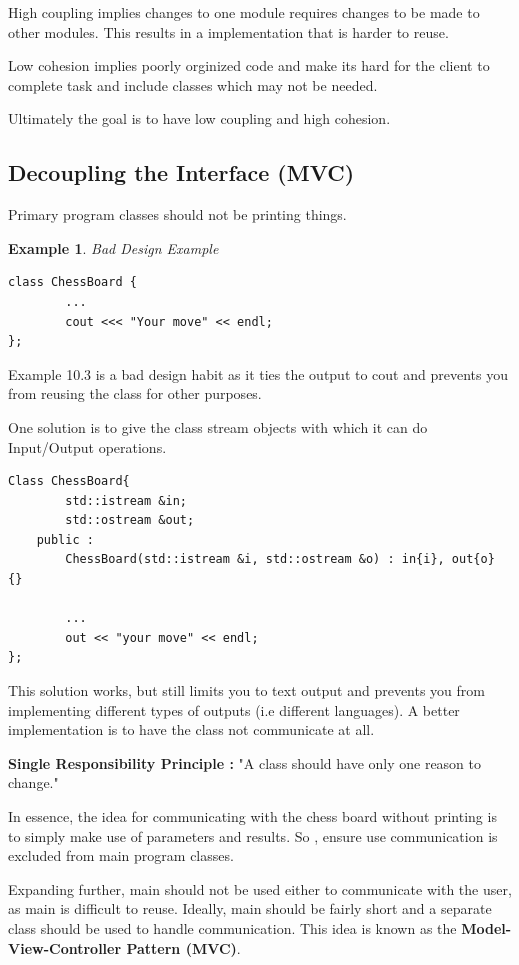 \documentclass{article}
\newtheorem{ex}[theorem]{Example}
\begin{document}
High coupling implies changes to one module requires changes to be made to other modules. This results in a implementation that is harder to reuse. 

Low cohesion implies poorly orginized code and make its hard for the client to complete task and include classes which may not be needed. 

Ultimately the goal is to have low coupling and high cohesion. 
 
\subsection{Decoupling the Interface (MVC)}
Primary program classes should not be printing things. 

\begin{ex}  Bad Design Example 
\begin{lstlisting}
class ChessBoard { 
		...
		cout <<< "Your move" << endl;
};
\end{lstlisting}
\end{ex}

Example 10.3 is a bad design habit as it ties the output to cout and prevents you from reusing the class for other purposes.

One solution is to give the class stream objects with which it can do Input/Output operations. 
\begin{lstlisting}
Class ChessBoard{
		std::istream &in;
		std::ostream &out;
	public : 
		ChessBoard(std::istream &i, std::ostream &o) : in{i}, out{o} {} 
		
		...
		out << "your move" << endl;
};
\end{lstlisting}

This solution works, but still limits you to text output and prevents you from implementing different types of outputs (i.e different languages). A better implementation is to have the class not communicate at all.  

\textbf{Single Responsibility Principle : } "A class should have only one reason to change."

In essence, the idea for communicating with the chess board without printing is to simply make use of parameters and results. So , ensure use communication is excluded from main program classes. 

Expanding further, main should not be used either to communicate with the user, as main is difficult to reuse. Ideally, main should be fairly short and a separate class should be used to handle communication.  This idea is known as the \textbf{Model-View-Controller Pattern (MVC)}.
\end{document}
